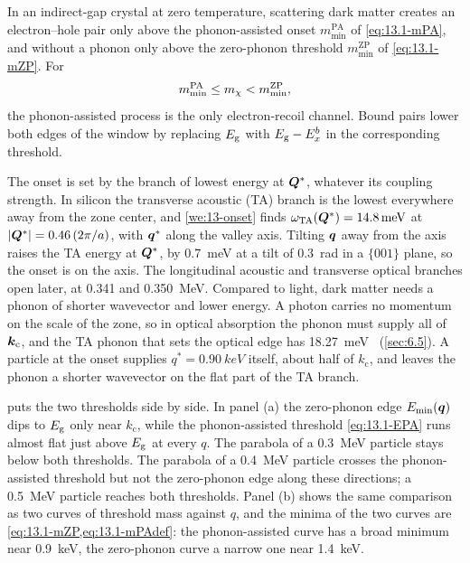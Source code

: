 \begin{keyresult}
In an indirect-gap crystal at zero temperature, scattering dark matter creates an electron--hole pair only above the phonon-assisted onset $m_{\mathrm{min}}^{\mathrm{PA}}$ of \cref{eq:13.1-mPA}, and without a phonon only above the zero-phonon threshold $m_{\mathrm{min}}^{\mathrm{ZP}}$ of \cref{eq:13.1-mZP}. For
\begin{equation*}
  m_{\mathrm{min}}^{\mathrm{PA}} \le m_{\chi} < m_{\mathrm{min}}^{\mathrm{ZP}} ,
\end{equation*}
the phonon-assisted process is the only electron-recoil channel. Bound pairs lower both edges of the window by replacing $E_{\mathrm{g}}$ with $E_{\mathrm{g}} - E_x^b$ in the corresponding threshold.
\end{keyresult}

The onset is set by the branch of lowest energy at $\bm{Q}^*$, whatever its coupling strength. In silicon the transverse acoustic (TA) branch is the lowest everywhere away from the zone center, and \cref{we:13-onset} finds $\omega_{\mathrm{TA}}(\bm{Q}^*) = \SI{14.8}{meV}$ at $|\bm{Q}^*| = 0.46\,(2\pi/a)$, with $\bm{q}^*$ along the valley axis. Tilting $\bm{q}$ away from the axis raises the TA energy at $\bm{Q}^*$, by \SI{0.7}{meV} at a tilt of \SI{0.3}{rad} in a $\{001\}$ plane, so the onset is on the axis. The longitudinal acoustic and transverse optical branches open later, at 0.341 and \SI{0.350}{MeV}. Compared to light, dark matter needs a phonon of shorter wavevector and lower energy. A photon carries no momentum on the scale of the zone, so in optical absorption the phonon must supply all of $\bm{k}_{\mathrm{c}}$, and the TA phonon that sets the optical edge has \SI{18.27}{meV}~\cite{macfarlane1958fine} (\cref{sec:6.5}). A particle at the onset supplies $q^* = \SI{0.90}{keV}$ itself, about half of $k_{\mathrm{c}}$, and leaves the phonon a shorter wavevector on the flat part of the TA branch.

 puts the two thresholds side by side. In panel (a) the zero-phonon edge $E_{\mathrm{min}}(\bm{q})$ dips to $E_{\mathrm{g}}$ only near $k_{\mathrm{c}}$, while the phonon-assisted threshold \cref{eq:13.1-EPA} runs almost flat just above $E_{\mathrm{g}}$ at every $q$. The parabola of a \SI{0.3}{MeV} particle stays below both thresholds. The parabola of a \SI{0.4}{MeV} particle crosses the phonon-assisted threshold but not the zero-phonon edge along these directions; a \SI{0.5}{MeV} particle reaches both thresholds. Panel (b) shows the same comparison as two curves of threshold mass against $q$, and the minima of the two curves are \cref{eq:13.1-mZP,eq:13.1-mPAdef}: the phonon-assisted curve has a broad minimum near \SI{0.9}{keV}, the zero-phonon curve a narrow one near \SI{1.4}{keV}.

